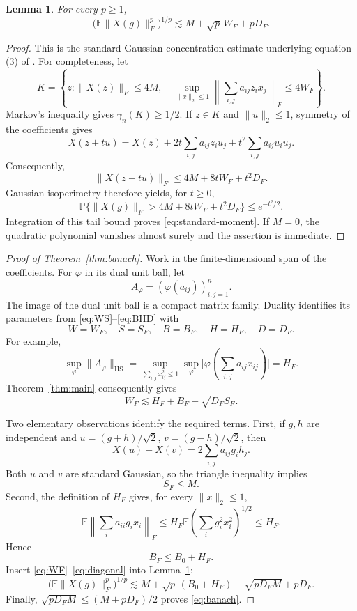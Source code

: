 \documentclass[10pt,a4paper]{amsart}
\numberwithin{equation}{section}
\newtheorem{lemma}[theorem]{Lemma}
\newcommand{\E}{\mathbb E}
\newcommand{\PP}{\mathbb P}
\newcommand{\norm}[1]{\lVert #1\rVert}
\newcommand{\abs}[1]{\lvert #1\rvert}
\newcommand{\HS}{\mathrm{HS}}
\begin{document}
\begin{lemma}\label{lem:moment}
For every $p\ge1$,
\begin{equation}
 \bigl(\E\norm{X(g)}_F^p\bigr)^{1/p}
 \lesssim M+\sqrt p\,W_F+pD_F.
 \label{eq:standard-moment}
\end{equation}
\end{lemma}

\begin{proof}
This is the standard Gaussian concentration estimate underlying equation (3) of \cite{ALM}. For completeness, let
\[
 K=\left\{z:\norm{X(z)}_F\le4M,\quad
 \sup_{\norm{x}_2\le1}\left\|\sum_{i,j}a_{ij}z_i x_j\right\|_F\le4W_F\right\}.
\]
Markov's inequality gives $\gamma_n(K)\ge1/2$. If $z\in K$ and $\norm{u}_2\le1$, symmetry of the coefficients gives
\[
 X(z+tu)=X(z)+2t\sum_{i,j}a_{ij}z_i u_j
                    +t^2\sum_{i,j}a_{ij}u_i u_j.
\]
Consequently,
\[
 \norm{X(z+tu)}_F\le4M+8tW_F+t^2D_F.
\]
Gaussian isoperimetry therefore yields, for $t\ge0$,
\[
 \PP\{\norm{X(g)}_F>4M+8tW_F+t^2D_F\}\le e^{-t^2/2}.
\]
Integration of this tail bound proves \eqref{eq:standard-moment}. If $M=0$, the quadratic polynomial vanishes almost surely and the assertion is immediate.
\end{proof}

\begin{proof}[Proof of Theorem~\ref{thm:banach}]
Work in the finite-dimensional span of the coefficients. For $\varphi$ in its dual unit ball, let
\[
 A_\varphi=(\varphi(a_{ij}))_{i,j=1}^n.
\]
The image of the dual unit ball is a compact matrix family. Duality identifies its parameters from \eqref{eq:WS}--\eqref{eq:BHD} with
\[
 W=W_F,\quad S=S_F,\quad B=B_F,\quad H=H_F,\quad D=D_F.
\]
For example,
\[
 \sup_\varphi\norm{A_\varphi}_{\HS}
 =\sup_{\sum_{i,j}x_{ij}^2\le1}
   \sup_\varphi\abs{\varphi\!\left(\sum_{i,j}a_{ij}x_{ij}\right)}=H_F.
\]
Theorem~\ref{thm:main} consequently gives
\begin{equation}
 W_F\lesssim H_F+B_F+\sqrt{D_FS_F}.
 \label{eq:WF}
\end{equation}

Two elementary observations identify the required terms. First, if $g,h$ are independent and
$u=(g+h)/\sqrt2$, $v=(g-h)/\sqrt2$, then
\[
 X(u)-X(v)=2\sum_{i,j}a_{ij}g_i h_j.
\]
Both $u$ and $v$ are standard Gaussian, so the triangle inequality implies
\begin{equation}
 S_F\le M.
 \label{eq:SFM}
\end{equation}
Second, the definition of $H_F$ gives, for every $\norm{x}_2\le1$,
\[
 \E\left\|\sum_i a_{ii}g_i x_i\right\|_F
 \le H_F\E\left(\sum_i g_i^2x_i^2\right)^{1/2}
 \le H_F.
\]
Hence
\begin{equation}
 B_F\le B_0+H_F.
 \label{eq:diagonal}
\end{equation}
Insert \eqref{eq:WF}--\eqref{eq:diagonal} into Lemma~\ref{lem:moment}:
\[
 \bigl(\E\norm{X(g)}_F^p\bigr)^{1/p}
 \lesssim M+\sqrt p\,(B_0+H_F)+\sqrt{pD_FM}+pD_F.
\]
Finally, $\sqrt{pD_FM}\le(M+pD_F)/2$ proves \eqref{eq:banach}.
\end{proof}
\end{document}
